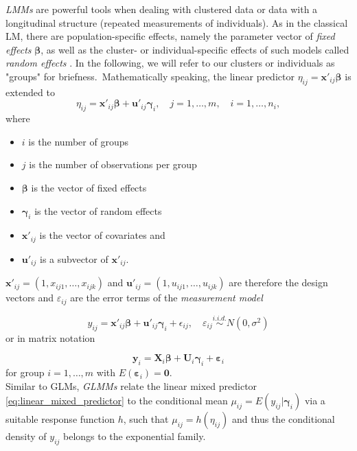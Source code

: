 \textit{\acp{LMM}} are powerful tools when dealing with clustered data or data with a longitudinal structure (repeated measurements of individuals).
As in the classical \ac{LM}, there are population-specific effects, namely the parameter vector of \textit{fixed effects} $\boldsymbol{\beta}$, as well as the cluster- or individual-specific effects of such models called \textit{random effects} \cite{fahrmeir2003regression}. In the following, we will refer to our clusters or individuals as "groups" for briefness.\ Mathematically speaking, the linear predictor $\eta_{ij}= \mathbf{x}'_{ij} \mathbf{\beta} $ is extended to
\begin{equation}
\eta_{ij} = \bm{{x'}}_{ij} \bm{\beta} + \bm{u'}_{ij}\bm{\gamma}_i, \quad j=1, \ldots, m, \quad i=1, \ldots, n_i, 
\label{eq:linear_mixed_predictor}
\end{equation}
where
\begin{itemize}
\item $i$ is the number of groups
\item $j$ is the number of observations per group
\item $\bm{\beta}$ is the vector of fixed effects
\item $\bm{\gamma}_i$ is the vector of random effects
\item $\bm{x'}_{ij}$ is the vector of covariates and
\item $\bm{u'}_{ij}$ is a subvector of $\bm{x'}_{ij}$.
\end{itemize}


$\bm{x'}_{ij} = (1, x_{ij1}, \ldots, x_{ijk}) $ and $ \bm{u'}_{ij} = (1, u_{ij1}, \ldots, u_{ijk}) $ are therefore the design vectors and $\varepsilon_{ij}$ are the error terms of the \textit{measurement model}

\begin{equation}
y_{ij} =  \bm{x'}_{ij} \bm{\beta} + \bm{u'}_{ij} \bm{\gamma}_i + \epsilon_{ij}, \quad \varepsilon_{i j} \overset{i.i.d.} \sim N\left(0, \sigma^{2}\right) 
\end{equation}
or in matrix notation

\begin{equation}
\bm{y}_{i}=\bm{X}_{i} \bm{\beta} + \bm{U}_{i} \bm{\gamma}_{i} + \bm{\varepsilon}_{i}
\end{equation}
for group $ i=1, \ldots, m $ with $ E(\bm{\varepsilon}_{i}) = \bm{0}$. \\

Similar to \acp{GLM}, \textit{\acp{GLMM}} relate the linear mixed predictor \ref{eq:linear_mixed_predictor} to the conditional mean 
$ \mu_{ij} = E(y_{ij} | \bm{\gamma}_{i}) $
via a suitable response function $h$, such that
$ \mu_{ij} = h(\eta_{ij}) $ and thus the conditional density of $y_{ij}$ belongs to the exponential family.